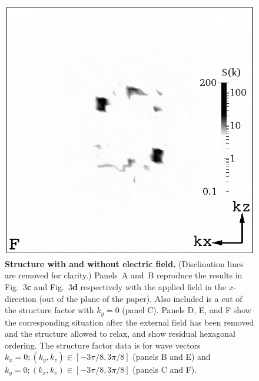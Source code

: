 \documentclass[12pt,twoside]{article}
\begin{document}
\begin{figure}[!h]
\begin{center}
\includegraphics[width=0.32\columnwidth]{sq_y_run1342.png}
\end{center}
\caption{\textbf{Structure with and without electric field.}
(Disclination lines are 
removed for clarity.) Panels~A and~B reproduce the results in Fig.~3\textbf{c}
and
Fig.~3\textbf{d} respectively with the applied field in the $x$-direction 
(out of the plane of the paper). Also included is a cut of the structure 
factor with $k_y = 0$ (panel C). 
Panels D, E, and F show the corresponding situation after the
external field has been removed and the structure allowed to relax,
and show residual hexagonal ordering. The structure factor data is for wave
vectors $k_x = 0; (k_y, k_z) \in [-3\pi/8 , 3\pi/8]$ (panels B and E) and
$k_y = 0; (k_x, k_z) \in [-3\pi/8, 3\pi/8]$ (panels C and F).}
\end{figure}

\newpage
\end{document}
